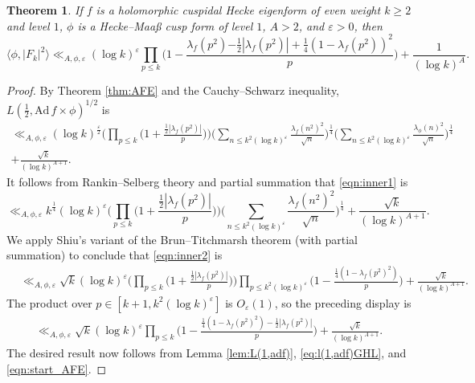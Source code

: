 \documentclass[12pt,reqno]{amsart}
\newtheorem{thm}{Theorem}[section]
\theoremstyle{remark}
\numberwithin{equation}{section}
\begin{document}
\begin{thm}
\label{thm:inner}
If $f$ is a holomorphic cuspidal Hecke eigenform of even weight $k\geq 2$ and level $1$, $\phi$ is a Hecke--Maa{\ss} cusp form of level $1$, $A>2$, and $\varepsilon>0$, then
\[
\langle \phi,|F_k|^2\rangle\ll_{A,\phi,\varepsilon}
(\log k)^{\varepsilon} \prod_{p\leq k}\Big(1-\frac{\lambda_f(p^2){-\frac{1}{2}|\lambda_f(p^2)|}+\frac{1}{4}(1-\lambda_f(p^2))^2}{p}\Big)+\frac{1}{(\log k)^A}.
\]	
\end{thm}
\begin{proof}
By Theorem \ref{thm:AFE} and the Cauchy--Schwarz inequality, $L(\frac{1}{2},\mathrm{Ad}\,f\times\phi)^{1/2}$ is
\begin{multline}
\label{eqn:inner1}
\ll_{A,\phi,\varepsilon}(\log k)^{\frac{\varepsilon}{2}} \Big(\prod_{p \le k} \Big( 1+\frac{\frac{1}{2}|\lambda_{f}(p^2)|}{p}\Big)\Big)\Big(\sum_{n\leq k^2(\log k)^{\varepsilon}}\frac{\lambda_f(n^2)^2}{\sqrt{n}}\Big)^{\frac{1}{4}}\Big(\sum_{n\leq k^2(\log k)^{\varepsilon}}\frac{\lambda_{\phi}(n)^2}{\sqrt{n}}\Big)^{\frac{1}{4}}
\\+\frac{\sqrt{k}}{(\log k)^{A+1}}.
\end{multline}
It follows from Rankin--Selberg theory and partial summation that \eqref{eqn:inner1} is
\begin{equation}
\label{eqn:inner2}
\ll_{A,\phi,\varepsilon} k^{\frac{1}{4}}  (\log k)^{\varepsilon} \Big(\prod_{p \le k} \Big( 1+\frac{\frac{1}{2}|\lambda_{f}(p^2)|}{p} \Big)\Big)\Big(\sum_{n\leq k^2(\log k)^{\varepsilon}}\frac{\lambda_{f}(n^2)^2}{\sqrt{n}}\Big)^{\frac{1}{4}}+\frac{{\sqrt{k}}}{(\log k)^{A+1}}.
\end{equation}
We apply Shiu's variant of the Brun--Titchmarsh theorem \cite[Theorem 1]{Shiu} (with partial summation) to conclude that \eqref{eqn:inner2} is
\begin{align*}
&\ll_{A,\phi,\varepsilon} \sqrt{k}{ (\log k)^{\varepsilon} \Big(\prod_{p \le k} \Big( 1+\frac{\frac{1}{2}|\lambda_{f}(p^2)|}{p} \Big)\Big)}\prod_{p\leq k^2(\log k)^{\varepsilon}}\Big(1-\frac{\frac{1}{4}(1-\lambda_f(p^2)^2)}{p}\Big)+\frac{\sqrt{k}}{(\log k)^{A+1}}.
\end{align*}
The product over $p\in[k+1,k^2(\log k)^{\varepsilon}]$ is $O_{\varepsilon}(1)$, so the preceding display is
\begin{align*}
\ll_{A,\phi,\varepsilon} \sqrt{k}{(\log k)^{\varepsilon} \prod_{p\leq k}\Big(1-\frac{\frac{1}{4}(1-\lambda_f(p^2)^2)-\frac{1}{2}|\lambda_{f}(p^2)|}{p}\Big)}+\frac{\sqrt{k}}{(\log k)^{A+1}}.
\end{align*}
The desired result now follows from Lemma \ref{lem:L(1,adf)}, \eqref{eq:l(1,adf)GHL}, and \eqref{eqn:start_AFE}.
\end{proof}
  
\end{document}
